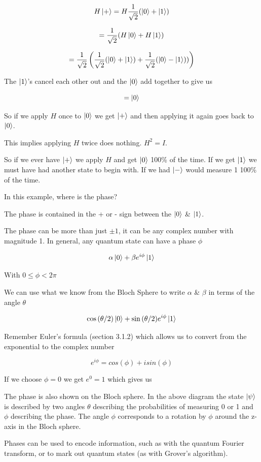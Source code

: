 \documentclass{book}
\begin{document}
$$ H\ket{+} = H \frac{1}{\sqrt{2}} ( \ket{0} + \ket{1})$$

$$= \frac{1}{\sqrt{2}} (H\ket{0} + H\ket{1})$$

$$ = \frac{1}{\sqrt{2}}\left( \frac{1}{\sqrt{2}}(\ket{0} + \ket{1})+\frac{1}{\sqrt{2}}(\ket{0} - \ket{1}))  \right)$$

The $\ket{1}$'s cancel each other out and the $\ket{0}$ add together to give us

$$ = \ket{0} $$

So if we apply $H$ once to $\ket{0}$ we get $\ket{+}$ and then applying it again goes back to $\ket{0}$. 

This implies applying $H$ twice does nothing. $H^2 = I$.

So if we ever have $\ket{+}$ we apply $H$ and get $\ket{0}$ 100\% of the time. If we get $\ket{1}$ we must have had another state to begin with. If we had $\ket{-}$ would measure 1 100\% of the time. 

In this example, where is the phase? 

The phase is contained in the + or - sign between the $\ket{0}$ \& $\ket{1}$. 

The phase can be more than just $\pm 1$, it can be any complex number with magnitude 1. In general, any quantum state can have a phase $\phi$ 

$$ \alpha\ket{0} + \beta e^{i\phi}\ket{1} $$

With $ 0 \leq \phi < 2\pi $

We can use what we know from the Bloch Sphere to write $\alpha$ \& $\beta$ in terms of the angle $\theta$

$$ \cos{(\theta/2)}\ket{0} + \sin{(\theta/2)} e^{i\phi}\ket{1} $$

Remember Euler's formula (section 3.1.2) which allows us to convert from the exponential to the complex number

$$ e^{i \phi} = cos(\phi) + i sin(\phi) $$

If we choose $\phi = 0$ we get $e^0 = 1$ which gives us 

The phase is also shown on the Bloch sphere. In the above diagram the state $\ket{\psi}$ is described by two angles $\theta$ describing the probabilities of measuring 0 or 1 and $\phi$ describing the phase. The angle $\phi$ corresponds to a rotation by $\phi$ around the z-axis in the Bloch sphere.  

Phases can be used to encode information, such as with the quantum Fourier transform, or to mark out quantum states (as with Grover's algorithm). 
\end{document}
